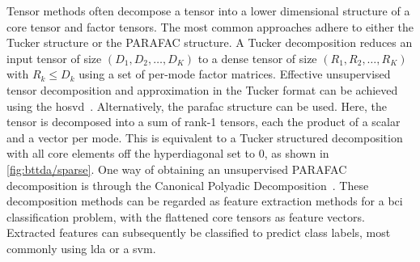 \documentclass[twocolumn]{article}
\begin{document}
Tensor methods often decompose a tensor into a lower dimensional structure of a
core tensor and factor tensors.
The most common approaches adhere to either the Tucker structure or the PARAFAC
structure.
A Tucker decomposition reduces an input tensor of size $(D_1,D_2,\ldots,D_K)$ to
a dense tensor of size $(R_1,R_2,\ldots,R_K)$ with $R_k \leq D_k$ using a
set of per-mode factor matrices.
Effective unsupervised tensor decomposition and approximation in the Tucker format can be achieved
using the \ac{hosvd}~\cite{DeLathauwer2000,SoleCasals2018}.
Alternatively, the \ac{parafac} structure can be used.
Here, the tensor is decomposed into a sum of rank-1 tensors, each the product
of a scalar and a vector per mode.
This is equivalent to a Tucker structured decomposition with all core elements
off the hyperdiagonal set to 0, as shown in \cref{fig:bttda/sparse}.
One way of obtaining an unsupervised PARAFAC decomposition is through the Canonical Polyadic
Decomposition~\cite{Hitchcock1927,Nazarpour2006}.
These decomposition methods can be regarded as feature extraction methods for a
\ac{bci} classification problem, with the flattened core tensors as feature vectors.
Extracted features can subsequently be classified to predict class labels, most
commonly using \ac{lda} or a \ac{svm}.


\end{document}
